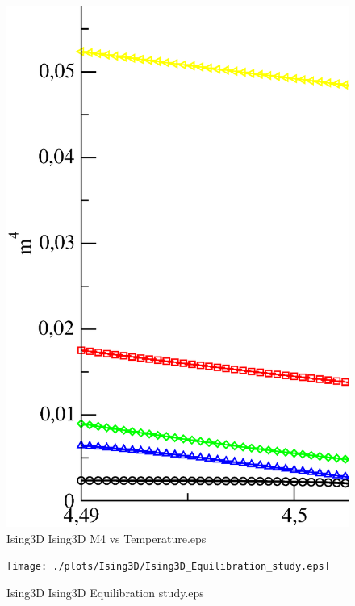 \begin{figure}[!htpb]
  \centering
  \includegraphics[width=\textwidth]{./plots/Ising3D/Ising3D_M4_vs_Temperature.eps}
  \caption{Ising3D Ising3D M4 vs Temperature.eps}
\end{figure}

\begin{figure}[!htpb]
  \centering
  \texttt{[image: ./plots/Ising3D/Ising3D\_Equilibration\_study.eps]}
  \caption{Ising3D Ising3D Equilibration study.eps}
\end{figure}

